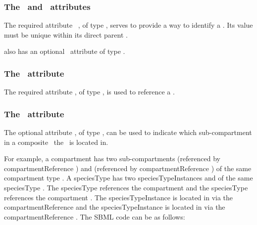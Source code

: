\subsubsection{The \idAtt\ and \nameAtt\ attributes}
\label{def:SpeciesTypeInstance:idAndName}

The required attribute \idAtt\ , of type \SIdPT, serves to provide a way to identify a \speciesTypeInstance. Its value must be unique within its direct parent \speciesType. 

 also has an optional \nameAtt\ attribute of type \stringPT. 

\subsubsection{The \speciesTypeAtt\ attribute}
\label{def:SpeciesTypeInstance:speciesType}

The required attribute \speciesTypeAtt, of type \SIdRefPT, is used to reference a \speciesType. 

\subsubsection{The \compartmentReferenceAtt\ attribute}
\label{def:SpeciesTypeInstance:compartmentReference}

The optional attribute \compartmentReferenceAtt, of type \SIdRefPT, can be used to indicate which sub-compartment in a composite \compartment\ the \speciesTypeInstance\ is located in. 

For example, a compartment  has two sub-compartments  (referenced by compartmentReference ) and  (referenced by compartmentReference ) of the same compartment type . A speciesType  has two speciesTypeInstances  and  of the same speciesType . The speciesType  references the compartment  and the speciesType  references the compartment . The speciesTypeInstance  is located in  via the compartmentReference  and the speciesTypeInstance  is located in  via the compartmentReference . The SBML code can be as follows:

\label{example:SpeciesTypeInstance_compartmentReference}

